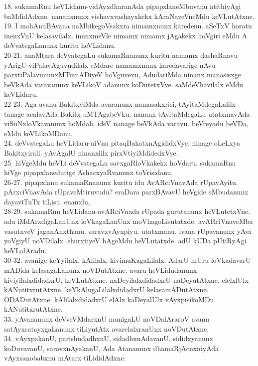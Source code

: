 \documentclass{article}
\begin{document}
18. sukamaRnu heVLidanu-vidAyxdharanAda pipapxlaneMbuvanu atithiyAgi baMdidAdxne. nananxnunx vishavxvashayxkekx kAraNaveVneMdu keVLutAtxne.\\
19. I mahAnuBAvana naMbikegoVsakxra nimamxnunx karedenu. aSeTxV horatu inenxVnU kelasavilalx. inunxmeVle nimamx nimamx jAgakekx hoVgiri eMdu A deVvategaLanunx kuritu heVLidanu.\\
20-21. anaMtara deVvategaLu sukamaRnanunx kuritu namamx dashaRnavu yArigU viPalavAguvudilalx eMdare namamxnunx karedavarige nAvu parxtiPalavununxMTumADiyeV hoVguvevu, AdudariMda ninanx manasisxge beVkAda varavanunx keVLikoV adanunx koDutetxVve. saMdeVhavilalx eMdu heVLidaru.\\
22-23. Aga avanu BakitxyiMda avaranunx namasakxrisi, tAyitaMdegaLalilx tanage acalavAda Bakitx uMTAgabeVku. nananx tAyitaMdegaLu utatxmavAda viSuNxloVkavanunx hoMdali. ideV nanage beVkAda varavu. beVreyadu beVDa, eMdu keVLikoMDanu.\\
24. deVvategaLu heVLidaru-niVnu pitaqBakatxnAgididxVye. ninage oLeLxya Bakitxyirali. yAvAgalU ninanxlilx pirxVtiyiMdidedxVve.\\
25. hiVgeMdu heVLi deVvategaLu savxgaRloVkakekx hoVdaru. sukamaRnu hiVge pipapxlanedurige AshacxyaRvanunx toVrisidanu.\\
26-27. pipapxlanu sukamaRnanunx kuritu idu AvARciVnavAda rUpavAyitu. pArxciVnavAda rUpaveMtiruvudu? eraDara parxBAvavU heVgide eMbudanunx dayaviTuTx tiLisu. enanxlu,\\
28-29. sukamaRnu heVLidanu-avARciVnada rUpada gurutanunx heVLutetxVne. adu iMdArxdigaLanUnx loVkagaLanUnx moVhagoLisutatxde. avARciVnaveMba vasutxveV jaganAnxthanu. saravxvAyxpiyu. utatxmanu. ivana rUpavanunx yAva yoVgiyU noVDilalx. shurxtiyeV hAgeMdu heVLutatxde. adU kUDa pUtiRyAgi heVLalAradu.\\
30-32. avanige keYyilalx, kAlilalx, kivimuKagaLilalx. AdarU mUru loVkadavarU mADida kelasagaLanunx noVDutAtxne. avaru heVLidudanunx kiviyilalxdidadxrU, keVLutAtxne. naDeyilalxdidadxrU naDeyutAtxne. elelxlUlx kANutitxrutAtxne. keYkAlugaLilalxdidadxrU kelasamADutAtxne. ODADutAtxne. kAlilalxdidadxrU elAlx kaDeyalUlx vAyxpisikoMDu kANutitxrutAtxne.\\
33. yAvananunx deVveVMdarxnU munigaLU noVDalAraroV avanu satAyxsatayxgaLanunx tiLiyutAtx avarelalxranUnx noVDutAtxne.\\
34. vAyxpakanU, parishudadhxnU, sidadhxnAdavanU, sididxyanunx koDuvavanU, saravxnAyakanU, Ada Atananunx dhamaRjAcnxniyAda vAyxsanobabxnu mAtarx tiLididAdxne.\\
\end{document}
